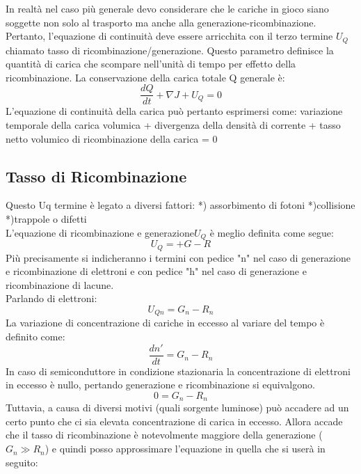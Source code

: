 In realtà nel caso più generale devo considerare che le cariche in gioco siano soggette non solo al trasporto ma anche alla generazione-ricombinazione.
Pertanto, l'equazione di continuità deve essere arricchita con il terzo termine $U_Q$ chiamato tasso di ricombinazione/generazione. Questo parametro definisce la quantità di carica che scompare nell'unità di tempo per effetto della ricombinazione.
La conservazione della carica totale Q generale è:
\begin{equation}
     \dfrac{dQ}{dt}+\nabla J +U_Q=0
\end{equation}
L'equazione di continuità della carica può pertanto esprimersi come:
variazione temporale della carica volumica + divergenza della densità di corrente + tasso netto volumico di ricombinazione della carica = 0

\subsection{Tasso di Ricombinazione}
Questo Uq termine è legato a diversi fattori:
*) assorbimento di fotoni
*)collisione
*)trappole o difetti\\
L'equazione di ricombinazione e generazione$U_Q$ è meglio definita come segue:
\begin{equation*}
    U_Q=+G-R
\end{equation*}
Più precisamente si indicheranno i termini con pedice "n" nel caso di generazione e ricombinazione di elettroni e con pedice "h" nel caso di generazione e ricombinazione di lacune.\\
Parlando di elettroni:
\begin{equation*}
    U_{Qn}=G_n-R_n
\end{equation*}
La variazione di concentrazione di cariche in eccesso al variare del tempo è definito come:
\begin{equation*}
    \dfrac{dn'}{dt}=G_n-R_n
\end{equation*}
In caso di semiconduttore in condizione stazionaria la concentrazione di elettroni in eccesso è nullo, pertando generazione e ricombinazione si equivalgono.
\begin{equation*}
    0=G_n - R_n
\end{equation*}
Tuttavia, a causa di diversi motivi (quali sorgente luminose) può accadere ad un certo punto che ci sia elevata concentrazione di carica in eccesso. Allora accade che il tasso di ricombinazione è notevolmente maggiore della generazione ($G_n \gg R_n$) e quindi posso approssimare l'equazione in quella che si userà in seguito:
